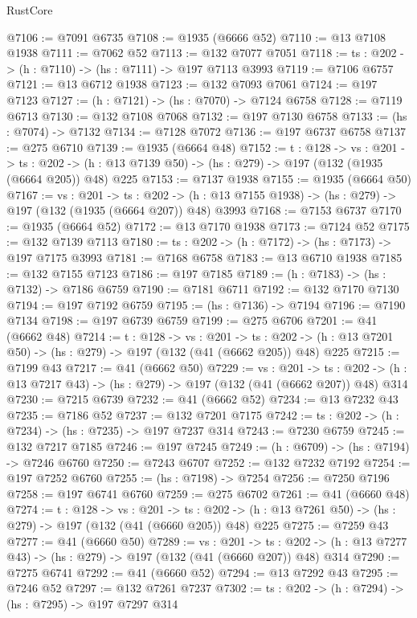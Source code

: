 \begin{lexlean}{RustCore}
\begin{coremodule}
@7106 := @7091 @6735
@7108 := @1935 (@6666 @52)
@7110 := @13 @7108 @1938
@7111 := @7062 @52
@7113 := @132 @7077 @7051
@7118 := {ts : @202} -> (h : @7110) -> (hs : @7111) -> @197 @7113 @3993
@7119 := @7106 @6757
@7121 := @13 @6712 @1938
@7123 := @132 @7093 @7061
@7124 := @197 @7123
@7127 := (h : @7121) -> (hs : @7070) -> @7124 @6758
@7128 := @7119 @6713
@7130 := @132 @7108 @7068
@7132 := @197 @7130 @6758
@7133 := (hs : @7074) -> @7132
@7134 := @7128 @7072
@7136 := @197 @6737 @6758
@7137 := @275 @6710
@7139 := @1935 (@6664 @48)
@7152 := {t : @128} ->
  {vs : @201} ->
  {ts : @202} -> (h : @13 @7139 @50) -> (hs : @279) -> @197 (@132 (@1935 (@6664 @205)) @48) @225
@7153 := @7137 @1938
@7155 := @1935 (@6664 @50)
@7167 := {vs : @201} ->
  {ts : @202} -> (h : @13 @7155 @1938) -> (hs : @279) -> @197 (@132 (@1935 (@6664 @207)) @48) @3993
@7168 := @7153 @6737
@7170 := @1935 (@6664 @52)
@7172 := @13 @7170 @1938
@7173 := @7124 @52
@7175 := @132 @7139 @7113
@7180 := {ts : @202} -> (h : @7172) -> (hs : @7173) -> @197 @7175 @3993
@7181 := @7168 @6758
@7183 := @13 @6710 @1938
@7185 := @132 @7155 @7123
@7186 := @197 @7185
@7189 := (h : @7183) -> (hs : @7132) -> @7186 @6759
@7190 := @7181 @6711
@7192 := @132 @7170 @7130
@7194 := @197 @7192 @6759
@7195 := (hs : @7136) -> @7194
@7196 := @7190 @7134
@7198 := @197 @6739 @6759
@7199 := @275 @6706
@7201 := @41 (@6662 @48)
@7214 := {t : @128} ->
  {vs : @201} ->
  {ts : @202} -> (h : @13 @7201 @50) -> (hs : @279) -> @197 (@132 (@41 (@6662 @205)) @48) @225
@7215 := @7199 @43
@7217 := @41 (@6662 @50)
@7229 := {vs : @201} ->
  {ts : @202} -> (h : @13 @7217 @43) -> (hs : @279) -> @197 (@132 (@41 (@6662 @207)) @48) @314
@7230 := @7215 @6739
@7232 := @41 (@6662 @52)
@7234 := @13 @7232 @43
@7235 := @7186 @52
@7237 := @132 @7201 @7175
@7242 := {ts : @202} -> (h : @7234) -> (hs : @7235) -> @197 @7237 @314
@7243 := @7230 @6759
@7245 := @132 @7217 @7185
@7246 := @197 @7245
@7249 := (h : @6709) -> (hs : @7194) -> @7246 @6760
@7250 := @7243 @6707
@7252 := @132 @7232 @7192
@7254 := @197 @7252 @6760
@7255 := (hs : @7198) -> @7254
@7256 := @7250 @7196
@7258 := @197 @6741 @6760
@7259 := @275 @6702
@7261 := @41 (@6660 @48)
@7274 := {t : @128} ->
  {vs : @201} ->
  {ts : @202} -> (h : @13 @7261 @50) -> (hs : @279) -> @197 (@132 (@41 (@6660 @205)) @48) @225
@7275 := @7259 @43
@7277 := @41 (@6660 @50)
@7289 := {vs : @201} ->
  {ts : @202} -> (h : @13 @7277 @43) -> (hs : @279) -> @197 (@132 (@41 (@6660 @207)) @48) @314
@7290 := @7275 @6741
@7292 := @41 (@6660 @52)
@7294 := @13 @7292 @43
@7295 := @7246 @52
@7297 := @132 @7261 @7237
@7302 := {ts : @202} -> (h : @7294) -> (hs : @7295) -> @197 @7297 @314

\end{coremodule}
\end{lexlean}
